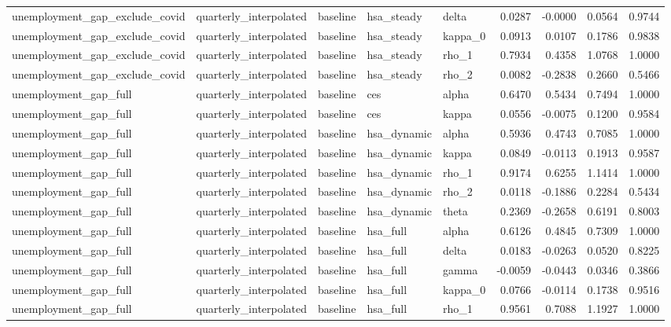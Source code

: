 \begin{tabular}{lllllrrrr}
unemployment\_gap\_exclude\_covid & quarterly\_interpolated & baseline & hsa\_steady & delta & 0.0287 & -0.0000 & 0.0564 & 0.9744 \\
unemployment\_gap\_exclude\_covid & quarterly\_interpolated & baseline & hsa\_steady & kappa\_0 & 0.0913 & 0.0107 & 0.1786 & 0.9838 \\
unemployment\_gap\_exclude\_covid & quarterly\_interpolated & baseline & hsa\_steady & rho\_1 & 0.7934 & 0.4358 & 1.0768 & 1.0000 \\
unemployment\_gap\_exclude\_covid & quarterly\_interpolated & baseline & hsa\_steady & rho\_2 & 0.0082 & -0.2838 & 0.2660 & 0.5466 \\
unemployment\_gap\_full & quarterly\_interpolated & baseline & ces & alpha & 0.6470 & 0.5434 & 0.7494 & 1.0000 \\
unemployment\_gap\_full & quarterly\_interpolated & baseline & ces & kappa & 0.0556 & -0.0075 & 0.1200 & 0.9584 \\
unemployment\_gap\_full & quarterly\_interpolated & baseline & hsa\_dynamic & alpha & 0.5936 & 0.4743 & 0.7085 & 1.0000 \\
unemployment\_gap\_full & quarterly\_interpolated & baseline & hsa\_dynamic & kappa & 0.0849 & -0.0113 & 0.1913 & 0.9587 \\
unemployment\_gap\_full & quarterly\_interpolated & baseline & hsa\_dynamic & rho\_1 & 0.9174 & 0.6255 & 1.1414 & 1.0000 \\
unemployment\_gap\_full & quarterly\_interpolated & baseline & hsa\_dynamic & rho\_2 & 0.0118 & -0.1886 & 0.2284 & 0.5434 \\
unemployment\_gap\_full & quarterly\_interpolated & baseline & hsa\_dynamic & theta & 0.2369 & -0.2658 & 0.6191 & 0.8003 \\
unemployment\_gap\_full & quarterly\_interpolated & baseline & hsa\_full & alpha & 0.6126 & 0.4845 & 0.7309 & 1.0000 \\
unemployment\_gap\_full & quarterly\_interpolated & baseline & hsa\_full & delta & 0.0183 & -0.0263 & 0.0520 & 0.8225 \\
unemployment\_gap\_full & quarterly\_interpolated & baseline & hsa\_full & gamma & -0.0059 & -0.0443 & 0.0346 & 0.3866 \\
unemployment\_gap\_full & quarterly\_interpolated & baseline & hsa\_full & kappa\_0 & 0.0766 & -0.0114 & 0.1738 & 0.9516 \\
unemployment\_gap\_full & quarterly\_interpolated & baseline & hsa\_full & rho\_1 & 0.9561 & 0.7088 & 1.1927 & 1.0000 \\

\end{tabular}
